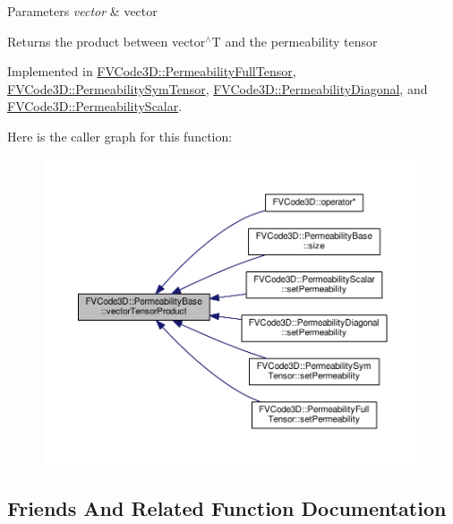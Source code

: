 \begin{DoxyParams}{Parameters}
{\em vector} & vector \\
\hline
\end{DoxyParams}
\begin{DoxyReturn}{Returns}
the product between vector$^\wedge$T and the permeability tensor 
\end{DoxyReturn}


Implemented in \hyperlink{classFVCode3D_1_1PermeabilityFullTensor_ac33ae20597f68533e0c7291fb8c49058}{F\+V\+Code3\+D\+::\+Permeability\+Full\+Tensor}, \hyperlink{classFVCode3D_1_1PermeabilitySymTensor_a98f843b5517b262ce5dc224a53607862}{F\+V\+Code3\+D\+::\+Permeability\+Sym\+Tensor}, \hyperlink{classFVCode3D_1_1PermeabilityDiagonal_a281067ac8a3ea3058ae886f036eadb01}{F\+V\+Code3\+D\+::\+Permeability\+Diagonal}, and \hyperlink{classFVCode3D_1_1PermeabilityScalar_a43773753c437729c9b32a215449e1504}{F\+V\+Code3\+D\+::\+Permeability\+Scalar}.



Here is the caller graph for this function\+:
\nopagebreak
\begin{figure}[H]
\begin{center}
\leavevmode
\includegraphics[width=350pt]{classFVCode3D_1_1PermeabilityBase_aa60c227795b5b7dd6413ef90b211875e_icgraph}
\end{center}
\end{figure}




\subsection{Friends And Related Function Documentation}
